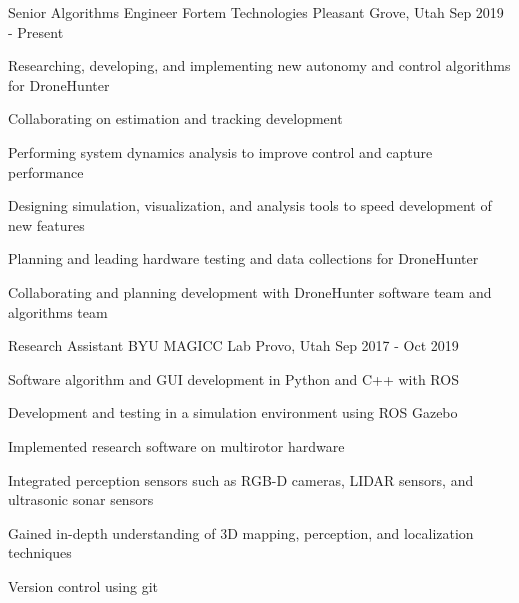 
\begin{cventries}

\cventry
  {Senior Algorithms Engineer}
  {Fortem Technologies}
  {Pleasant Grove, Utah}
  {Sep 2019 - Present}
  {
    \begin{cvitems}
      \item{Researching, developing, and implementing new autonomy and control algorithms for DroneHunter}
      \item{Collaborating on estimation and tracking development}
      \item{Performing system dynamics analysis to improve control and capture performance}
      \item{Designing simulation, visualization, and analysis tools to speed development of new features}
      \item{Planning and leading hardware testing and data collections for DroneHunter}
      \item{Collaborating and planning development with DroneHunter software team and algorithms team}
    \end{cvitems}
  }

\cventry
  {Research Assistant} %
  {BYU MAGICC Lab} %
  {Provo, Utah} %
  {Sep 2017 - Oct 2019} %
  {
    \begin{cvitems} %
      \item{Software algorithm and GUI development in Python and C++ with ROS}
      \item{Development and testing in a simulation environment using ROS Gazebo}
      \item{Implemented research software on multirotor hardware}
      \item{Integrated perception sensors such as RGB-D cameras, LIDAR sensors, and ultrasonic sonar sensors}
      \item{Gained in-depth understanding of 3D mapping, perception, and localization techniques}
      \item{Version control using git}
    \end{cvitems}
  }


\end{cventries}
